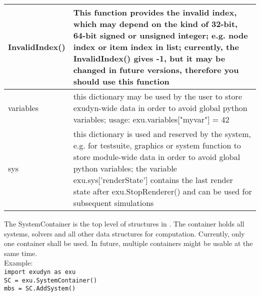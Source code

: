 \begin{center}
\begin{longtable}{| p{8cm} | p{8cm} |}
  InvalidIndex() & This function provides the invalid index, which may depend on the kind of 32-bit, 64-bit signed or unsigned integer; e.g. node index or item index in list; currently, the InvalidIndex() gives -1, but it may be changed in future versions, therefore you should use this function\\ \hline 
  variables & this dictionary may be used by the user to store exudyn-wide data in order to avoid global python variables; usage: exu.variables["myvar"] = 42 \\ \hline  
  sys & this dictionary is used and reserved by the system, e.g. for testsuite, graphics or system function to store module-wide data in order to avoid global python variables; the variable exu.sys['renderState'] contains the last render state after exu.StopRenderer() and can be used for subsequent simulations \\ \hline  
\end{longtable}
\end{center}

The SystemContainer is the top level of structures in \codeName. The container holds all systems, solvers and all other data structures for computation. Currently, only one container shall be used. In future, multiple containers might be usable at the same time. \\ Example: \\ \texttt{import exudyn as exu \\ SC = exu.SystemContainer() \\ mbs = SC.AddSystem()}

